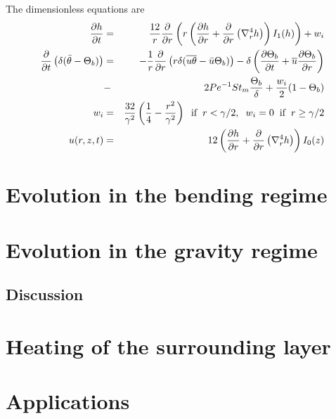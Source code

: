 The dimensionless equations are
\begin{eqnarray}
  \frac{\partial h}{\partial t}& =& \frac{12}{r}
                                    \frac{\partial}{\partial r} \left( r\left( \frac{\partial h}{\partial      r}+\frac{\partial}{\partial      r}\left(\nabla_r^4h\right)\right)I_1(h)\right)
                                    + w_i\label{EqFinal1}\\
  \frac{\partial}{\partial
  t}\left( \delta( \bar{\theta}-\Theta_b)\right)&=&-\frac{1}{r}\frac{\partial}{\partial
                                                    r}  \left(   r\delta(\overline{u\theta}-\bar{u}\Theta_b)\right)  -
                                                    \delta\left(      \frac{\partial       \Theta_b}{\partial      t}+
                                                    \overline{u}\frac{\partial     \Theta_b}{\partial    r}\right)\nonumber\\
                               &-&
                                   2Pe^{-1}St_m\frac{\Theta_b}{\delta}+\frac{w_{i}}{2}(1-\Theta_b)\label{HeatDimensionLess}\\
  w_{i}&=&
           \frac{32}{\gamma^{2}}\left(\frac{1}{4}-\frac{r^{2}}{\gamma^{2}}\right)\hspace{.2cm}
           \text{if} \hspace{.2cm} r < \gamma/2,\hspace{.2cm} w_i=0 \hspace{.2cm}
           \text{if} \hspace{.2cm} r \ge \gamma/2\\
  u(r,z,t)&   =&   12\left(   \frac{\partial   h}{\partial
                 r}+\frac{\partial}{\partial
                 r}\left(\nabla_r^4h\right)\right)I_0(z)\label{C3-Veloc}
\end{eqnarray}


\section{Evolution in the bending regime}
\label{sec:evol-bend-regime-1}


\section{Evolution in the gravity regime}
\label{sec:evol-grav-regime}



\subsection{Discussion}

\section{Heating of the surrounding layer}
\label{sec:heat-surr-layer}


\section{Applications}
\label{sec:applications}





